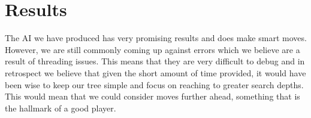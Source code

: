\documentclass[a4paper, 12pt]{article}
\begin{document}
\section{Results}
The AI we have produced has very promising results and does make smart moves. However, we are still commonly coming up against errors which we believe are a result of threading issues. This means that they are very difficult to debug and in retrospect we believe that given the short amount of time provided, it would have been wise to keep our tree simple and focus on reaching to greater search depths. This would mean that we could consider moves further ahead, something that is the hallmark of a good player.
\end{document}
